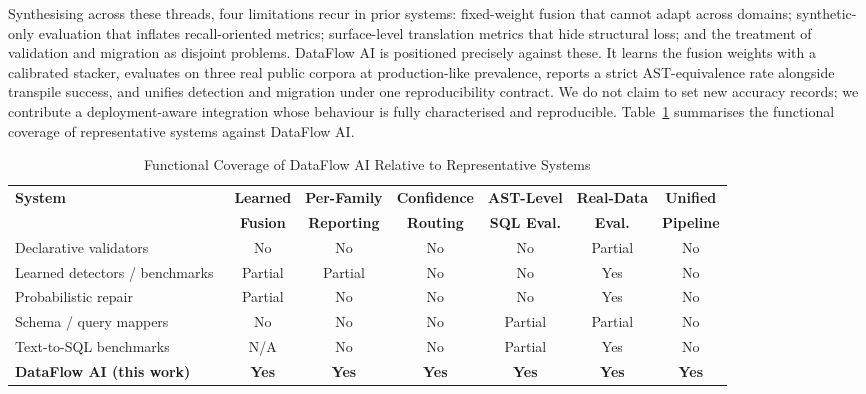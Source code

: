 \documentclass{ieeeaccess}
\begin{document}
Synthesising across these threads, four limitations recur in prior systems:
fixed-weight fusion that cannot adapt across domains; synthetic-only evaluation
that inflates recall-oriented metrics; surface-level translation metrics that
hide structural loss; and the treatment of validation and migration as disjoint
problems. DataFlow AI is positioned precisely against these. It learns the fusion
weights with a calibrated stacker, evaluates on three real public corpora at
production-like prevalence, reports a strict AST-equivalence rate alongside
transpile success, and unifies detection and migration under one reproducibility
contract. We do not claim to set new accuracy records; we contribute a
deployment-aware integration whose behaviour is fully characterised and
reproducible. Table~\ref{tab:coverage} summarises the functional coverage of
representative systems against DataFlow AI.

\begin{table}[tp]
\centering
\caption{Functional Coverage of DataFlow AI Relative to Representative Systems}
\label{tab:coverage}
\begin{tabular}{|l|c|c|c|c|c|c|}
\hline
\textbf{System} & \textbf{Learned} & \textbf{Per-Family} & \textbf{Confidence}
  & \textbf{AST-Level} & \textbf{Real-Data} & \textbf{Unified} \\
 & \textbf{Fusion} & \textbf{Reporting} & \textbf{Routing}
  & \textbf{SQL Eval.} & \textbf{Eval.} & \textbf{Pipeline} \\
\hline
Declarative validators~\cite{schelter2018automating} & No & No & No & No & Partial & No \\ \hline
Learned detectors / benchmarks~\cite{han2022adbench} & Partial & Partial & No & No & Yes & No \\ \hline
Probabilistic repair~\cite{rekatsinas2017holoclean} & Partial & No & No & No & Yes & No \\ \hline
Schema / query mappers~\cite{rahm2001survey} & No & No & No & Partial & Partial & No \\ \hline
Text-to-SQL benchmarks~\cite{li2023bird} & N/A & No & No & Partial & Yes & No \\ \hline
\textbf{DataFlow AI (this work)} & \textbf{Yes} & \textbf{Yes} & \textbf{Yes} & \textbf{Yes} & \textbf{Yes} & \textbf{Yes} \\ \hline
\end{tabular}
\end{table}

\end{document}
